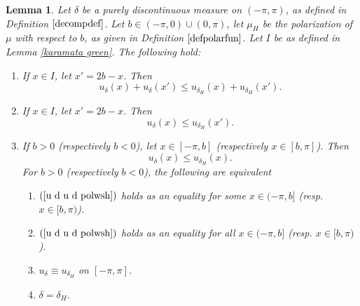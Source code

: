 \documentclass[11pt]{amsart}
\newtheorem{lemma}[theorem]{Lemma}
\numberwithin{equation}{section}
\begin{document}
\begin{lemma}\label{karamata u d}
Let \(\delta\) be a purely discontinuous measure on \((-\pi,\pi)\), as defined in Definition \(\ref{decompdef}\). Let \(b\in(-\pi,0)\cup(0,\pi)\), let \(\mu_H\) be the polarization of \(\mu\) with respect to \(b\), as given in Definition \(\ref{defpolarfun}\). Let \(I\) be as defined in Lemma \textnormal{\ref{karamata green}}. The following hold:
\begin{enumerate}
    \item[(a)] If \(x\in I\), let \(x'=2b-x\). Then
    \begin{equation}\label{u d syn u d}
    u_\delta(x)+u_\delta(x')\leq u_{\delta_H}(x)+u_{\delta_H}(x').
    \end{equation}
    \item[(b)] If \(x\in I\), let \(x'=2b-x\). Then
    \begin{equation}\label{u d u d polwsh polwsh}
    u_\delta(x)\leq u_{\delta_H}(x').
    \end{equation}
    \item[(c)] If \(b>0\) (respectively \(b<0\)), let \(x\in[-\pi,b]\) (respectively \(x\in [b,\pi]\)). Then 
    \begin{equation}\label{u d u d polwsh}
    u_\delta(x)\leq u_{\delta_H}(x).
    \end{equation}
    For \(b>0\) (respectively \(b<0\)), the following are equivalent
    \begin{enumerate}
        \item[(i)] \((\ref{u d u d polwsh})\) holds as an equality for some \(x\in(-\pi,b]\) (resp. \(x\in [b,\pi)\)).
        \item[(ii)] \((\ref{u d u d polwsh})\) holds as an equality for all \(x\in(-\pi,b]\) (resp. \(x\in [b,\pi)\)).
        \item[(iii)] \(u_\delta\equiv u_{\delta_H}\) on \([-\pi,\pi]\).
        \item[(iv)] \(\delta=\delta_H\).
    \end{enumerate}
\end{enumerate}
\end{lemma}
\end{document}

